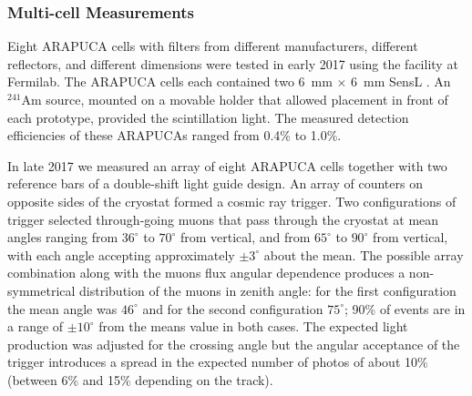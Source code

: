 \subsubsection{Multi-cell Measurements}


Eight ARAPUCA cells with filters from different manufacturers, different reflectors, and different dimensions were tested in early 2017 using the  facility at Fermilab.  
The ARAPUCA cells each contained two \SI{6}{mm} $\times$ \SI{6}{mm} SensL . 
An $^{241}$Am source, mounted on a movable holder that allowed placement in front of each prototype, provided the scintillation light. The measured detection efficiencies of these ARAPUCAs ranged from 0.4\% to 1.0\%.

In late 2017 we measured an array of eight ARAPUCA cells together with two reference bars of a double-shift light guide design. An array of counters on opposite sides of the cryostat formed a cosmic ray trigger. 
Two configurations of trigger selected through-going muons that pass through the cryostat at mean angles ranging from $36^{\circ} $ to $70^{\circ} $ from vertical, and from $65^{\circ} $ to $90^{\circ} $ from vertical, with each angle accepting approximately $\pm 3^{\circ}$ about the mean. The possible array combination along with the muons flux angular dependence produces a non-symmetrical distribution of the muons in zenith angle: for the first configuration the mean angle was $46^{\circ}$ and for the second configuration $75^{\circ}$; 90\% of events are in a range of $\pm 10^{\circ}$ from the means value in both cases.
The expected light production was adjusted for the crossing angle but the angular acceptance of the trigger introduces a spread in the expected number of photos of about 10\% (between 6\% and 15\% depending on the track).


